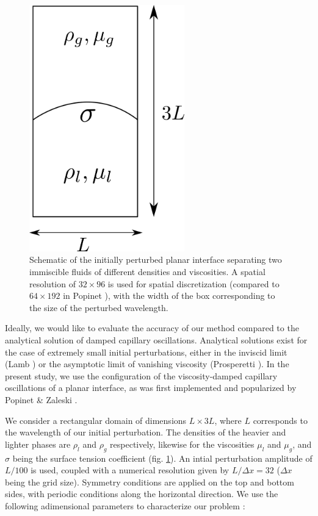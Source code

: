 \begin{figure}[h!]
    \centering
    \includegraphics[width = 0.6\textwidth]{plots/capwave/config.png}
	\caption{Schematic of the initially perturbed planar interface separating two immiscible fluids of different densities and viscosities. A spatial resolution of $32 \times 96$ is used for spatial discretization (compared to $64 \times 192$ in Popinet \cite{popinet2009accurate}), with the width of the box corresponding to the size of the perturbed wavelength.}
    \label{capwave_conf}
\end{figure}


Ideally, we would like to evaluate the accuracy of our method compared to the analytical solution of damped capillary oscillations. Analytical solutions exist for the case of extremely small initial perturbations, either in the inviscid limit (Lamb ) or the asymptotic limit of vanishing viscosity (Prosperetti ). In the present study, we use the configuration of the viscosity-damped capillary oscillations of a planar interface, as was first implemented and popularized by Popinet \& Zaleski \cite{popinet1999front}.  

We consider a rectangular domain of dimensions $L \times 3L$, where $L$ corresponds to the wavelength of our initial perturbation. The densities of the heavier and lighter phases are $\rho_l$ and $\rho_g$ respectively, likewise for the viscosities $\mu_l$ and $\mu_g$, and $\sigma$ being the surface tension coefficient (fig. \ref{capwave_conf}). An intial perturbation amplitude of $L/100$ is used, coupled with a numerical resolution given by $L/\Delta x= 32$ ($\Delta x$ being the grid size). Symmetry conditions are applied on the top and bottom sides, with periodic conditions along the horizontal direction. We use the following adimensional parameters to characterize our problem : 

